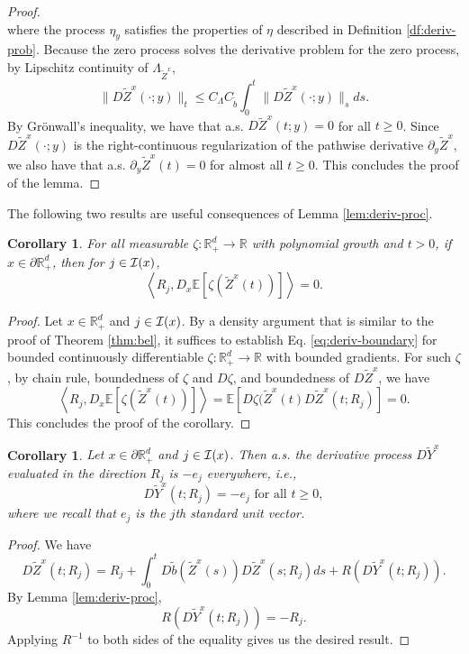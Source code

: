 \documentclass[11pt]{article}
\theoremstyle{definition}
\theoremstyle{plain}
\newtheorem{corollary}[assumption]{Corollary}
\newcommand{\R}{\mathbb{R}}
\newcommand{\E}{\mathbb{E}}
\newcommand{\cI}{{\cal I}}
\newcommand{\tb}{\tilde{b}}
\begin{document}
\begin{appendices}
\begin{proof}
\[\]
where the process $\eta_y$ satisfies the properties of $\eta$ described in Definition \ref{df:deriv-prob}.
Because the zero process solves the derivative problem for the zero process, by Lipschitz continuity of \( \Lambda_{\tilde Z^x} \),
\[
\| D\tilde{Z}^x(\cdot; y) \|_t \leq C_\Lambda C_{\tb} \int_0^t \| D\tilde{Z}^x(\cdot; y) \|_s ds.
\]
By Grönwall's inequality, we have that a.s.
$D\tilde{Z}^x(t; y) = 0$ for all $t \geq 0$. Since $D\tilde{Z}^x(\cdot; y)$ is the right-continuous regularization of the pathwise derivative $\partial_y \tilde{Z}^x$, 
we also have that a.s. $\partial_y \tilde{Z}^x(t) = 0$ for almost all $t \geq 0$. This concludes the proof of the lemma.
\end{proof}
The following two results are useful consequences of Lemma \ref{lem:deriv-proc}.
\begin{corollary}\label{cor:deriv-boundary}
For all measurable \( \zeta : \mathbb{R}_+^d \to \R \) with polynomial growth and \( t > 0 \), if \( x \in \partial \mathbb{R}_+^d \), 
then for $j \in \cI(x)$,
\begin{equation}\label{eq:deriv-boundary}
\left\langle R_j, D_x \E\left[\zeta(\tilde{Z}^x(t))\right] \right\rangle = 0.
\end{equation}
\end{corollary}
\begin{proof}
Let $x\in \R_+^d$ and $j \in \cI(x)$.
By a density argument that is similar to the proof of Theorem \ref{thm:bel}, it suffices to establish Eq. \eqref{eq:deriv-boundary} for 
bounded continuously differentiable $\zeta : \R_+^d \to \R$ with bounded gradients. 
For such $\zeta$, by chain rule, boundedness of $\zeta$ and $D\zeta$, and boundedness of $D\tilde Z^x$, we have
\[
\left\langle R_j, D_x \E\left[\zeta(\tilde{Z}^x(t))\right] \right\rangle = \E\left[D\zeta(\tilde Z^x(t) D\tilde Z^x(t; R_j)\right] = 0.
\]
This concludes the proof of the corollary.
\end{proof}
\begin{corollary}\label{cor:DY-boundary}
Let \( x \in \partial \mathbb{R}_+^d \) and \( j \in \cI(x) \). Then a.s. the derivative process $D\tilde Y^x$ 
evaluated in the direction $R_j$ is $-e_j$ everywhere, i.e.,
\[
D \tilde Y^x(t; R_j) = -e_j \text{ for all } t \geq 0,
\]
where we recall that $e_j$ is the $j$th standard unit vector.
\end{corollary}
\begin{proof}
We have 
\[
D\tilde{Z}^x(t; R_j) = R_j + \int_0^t D\tb(\tilde{Z}^x(s)) D\tilde{Z}^x(s; R_j) ds + R\left(D\tilde Y^x(t; R_j)\right).
\]
By Lemma \ref{lem:deriv-proc},
\[
R\left(D\tilde Y^x(t; R_j)\right) = -R_j.
\]
Applying $R^{-1}$ to both sides of the equality gives us the desired result. 
\end{proof}


\end{appendices}
\end{document}
